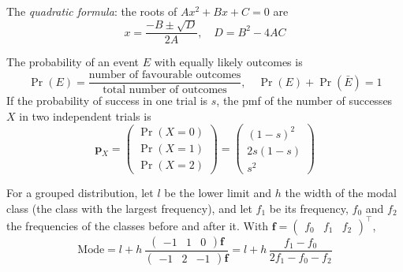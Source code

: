 \item The \emph{quadratic formula}: the roots of $Ax^2 + Bx + C = 0$ are
\begin{equation}
x = \frac{-B \pm \sqrt{D}}{2A}, \quad D = B^2 - 4AC
\label{c10eq:quadf}
\end{equation}

\item The probability of an event $E$ with equally likely outcomes is
\begin{equation}
\Pr(E) = \frac{\text{number of favourable outcomes}}{\text{total number of outcomes}}, \quad \Pr(E) + \Pr(\bar{E}) = 1
\label{c10eq:prob}
\end{equation}
If the probability of success in one trial is $s$, the pmf of the number of successes $X$ in two independent trials is
\begin{equation}
\mathbf{p}_X = \begin{pmatrix} \Pr(X = 0) \\ \Pr(X = 1) \\ \Pr(X = 2) \end{pmatrix} = \begin{pmatrix} (1-s)^2 \\ 2s(1-s) \\ s^2 \end{pmatrix}
\label{c10eq:twotrials}
\end{equation}

\item For a grouped distribution, let $l$ be the lower limit and $h$ the width of the modal class (the class with the largest frequency), and let $f_1$ be its frequency, $f_0$ and $f_2$ the frequencies of the classes before and after it. With $\mathbf{f} = \begin{pmatrix} f_0 & f_1 & f_2 \end{pmatrix}^{\top}$,
\begin{equation}
\text{Mode} = l + h\,\frac{\begin{pmatrix} -1 & 1 & 0 \end{pmatrix}\mathbf{f}}{\begin{pmatrix} -1 & 2 & -1 \end{pmatrix}\mathbf{f}} = l + h\,\frac{f_1 - f_0}{2f_1 - f_0 - f_2}
\label{c10eq:modegrouped}
\end{equation}


